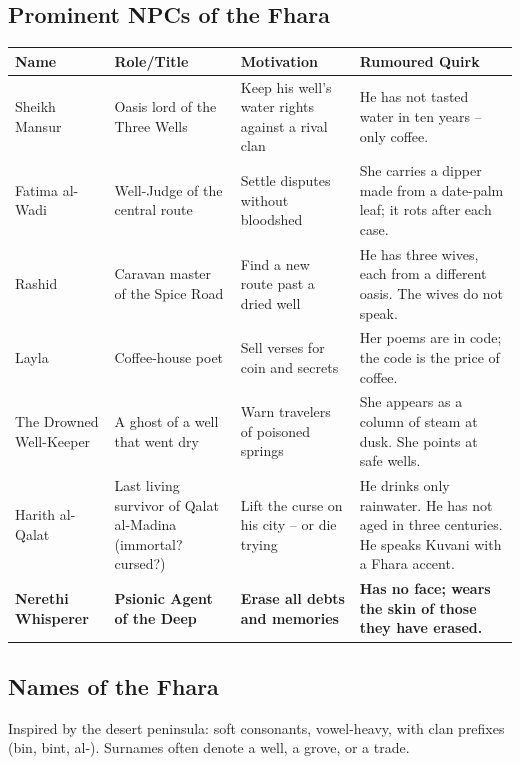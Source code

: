 \subsection*{Prominent NPCs of the Fhara}
\label{sec:fhara-npcs}

\begin{longtable}{|p{}|p{}|p{}|p{}|}
\hline
\textbf{Name} & \textbf{Role/Title} & \textbf{Motivation} & \textbf{Rumoured Quirk} \\
\hline
Sheikh Mansur & Oasis lord of the Three Wells & Keep his well's water rights against a rival clan & He has not tasted water in ten years -- only coffee. \\
\hline
Fatima al-Wadi & Well-Judge of the central route & Settle disputes without bloodshed & She carries a dipper made from a date-palm leaf; it rots after each case. \\
\hline
Rashid & Caravan master of the Spice Road & Find a new route past a dried well & He has three wives, each from a different oasis. The wives do not speak. \\
\hline
Layla & Coffee-house poet & Sell verses for coin and secrets & Her poems are in code; the code is the price of coffee. \\
\hline
The Drowned Well-Keeper & A ghost of a well that went dry & Warn travelers of poisoned springs & She appears as a column of steam at dusk. She points at safe wells. \\
\hline
Harith al-Qalat & Last living survivor of Qalat al-Madina (immortal? cursed?) & Lift the curse on his city -- or die trying & He drinks only rainwater. He has not aged in three centuries. He speaks Kuvani with a Fhara accent. \\
\hline
\textbf{Nerethi Whisperer} & \textbf{Psionic Agent of the Deep} & \textbf{Erase all debts and memories} & \textbf{Has no face; wears the skin of those they have erased.} \\
\hline
\end{longtable}

\subsection*{Names of the Fhara}
\label{sec:fhara-names}

Inspired by the desert peninsula: soft consonants, vowel-heavy, with clan prefixes (bin, bint, al-). Surnames often denote a well, a grove, or a trade.


